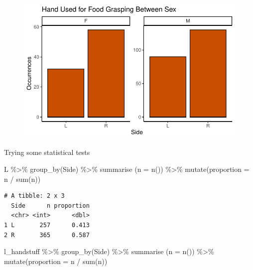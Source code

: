 \documentclass[
  letterpaper,
  DIV=11,
  numbers=noendperiod]{scrartcl}
\newenvironment{Shaded}{\begin{snugshade}}{\end{snugshade}}
\newcommand{\AttributeTok}[1]{\textcolor[rgb]{0.40,0.45,0.13}{#1}}
\newcommand{\FunctionTok}[1]{\textcolor[rgb]{0.28,0.35,0.67}{#1}}
\newcommand{\NormalTok}[1]{\textcolor[rgb]{0.00,0.23,0.31}{#1}}
\newcommand{\SpecialCharTok}[1]{\textcolor[rgb]{0.37,0.37,0.37}{#1}}
\begin{document}
\begin{figure}[H]

{\centering \includegraphics{LeftyLemurs_files/figure-pdf/unnamed-chunk-39-1.pdf}

}

\end{figure}

Trying some statistical tests

\begin{Shaded}
\begin{Highlighting}[]
\NormalTok{L }\SpecialCharTok{\%\textgreater{}\%} 
  \FunctionTok{group\_by}\NormalTok{(Side) }\SpecialCharTok{\%\textgreater{}\%} 
  \FunctionTok{summarise}\NormalTok{ (}\AttributeTok{n =} \FunctionTok{n}\NormalTok{()) }\SpecialCharTok{\%\textgreater{}\%}
  \FunctionTok{mutate}\NormalTok{(}\AttributeTok{proportion =}\NormalTok{ n }\SpecialCharTok{/} \FunctionTok{sum}\NormalTok{(n))}
\end{Highlighting}
\end{Shaded}

\begin{verbatim}
# A tibble: 2 x 3
  Side      n proportion
  <chr> <int>      <dbl>
1 L       257      0.413
2 R       365      0.587
\end{verbatim}

\begin{Shaded}
\begin{Highlighting}[]
\NormalTok{l\_handstuff }\SpecialCharTok{\%\textgreater{}\%} 
  \FunctionTok{group\_by}\NormalTok{(Side) }\SpecialCharTok{\%\textgreater{}\%} 
  \FunctionTok{summarise}\NormalTok{ (}\AttributeTok{n =} \FunctionTok{n}\NormalTok{()) }\SpecialCharTok{\%\textgreater{}\%}
  \FunctionTok{mutate}\NormalTok{(}\AttributeTok{proportion =}\NormalTok{ n }\SpecialCharTok{/} \FunctionTok{sum}\NormalTok{(n))}
\end{Highlighting}
\end{Shaded}
\end{document}
